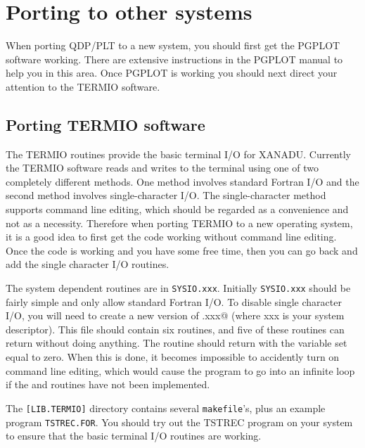 \section{Porting to other systems}

When porting QDP/PLT to a new system, you should first get the
PGPLOT software working.
There are extensive instructions in the PGPLOT manual to help you
in this area.
Once PGPLOT is working you should next direct your attention to the
TERMIO software.

\subsection{Porting TERMIO software}

The TERMIO routines provide the basic terminal I/O for XANADU.
Currently the TERMIO software reads
and writes to the terminal using one of two completely different
methods.
One method involves standard Fortran I/O and the second method involves
single-character I/O.
The single-character method supports command line editing, which should
be regarded as a convenience and not as a necessity.
Therefore when porting TERMIO to a new operating system, it is a good
idea to first get the code working without command line editing.
Once the code is working and you have some free time, then you can
go back and add the single character I/O routines.

The system dependent routines are in {\tt SYSIO.xxx}.
Initially {\tt SYSIO.xxx} should be fairly simple and
only allow standard Fortran I/O.
To disable single character I/O, you will need to create a new version
of \verb@SYSIO.xxx@ (where xxx is your system descriptor).
This file should contain six routines, and five of these routines
can return without doing anything.
The routine \verb@FORTYP@ should return with the variable \verb@IFTYPE@
set equal to zero.
When this is done, it becomes impossible to accidently turn on command
line editing, which would cause the program to go into an infinite
loop if the \verb@RDCHR@ and \verb@PUTSTR@ routines have not been
implemented.

The {\tt [LIB.TERMIO]} directory contains several {\tt makefile}'s,
plus an example program {\tt TSTREC.FOR}.
You should try out the TSTREC program on your system to ensure that
the basic terminal I/O routines are working.

